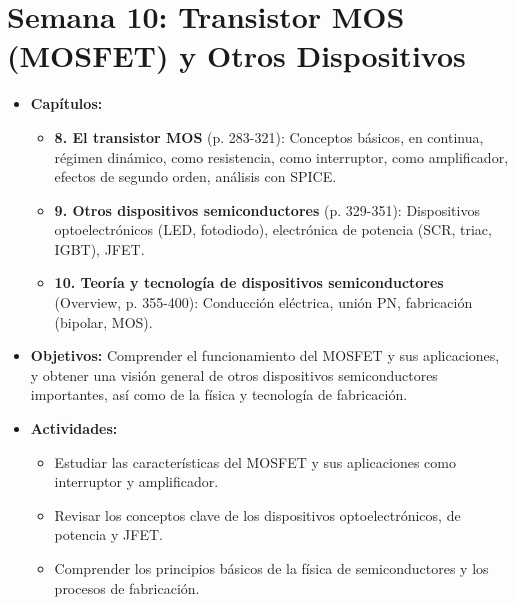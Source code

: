 \documentclass[12pt,a4paper]{article}
\begin{document}
\section{Semana 10: Transistor MOS (MOSFET) y Otros Dispositivos}
\begin{itemize}
    \item \textbf{Capítulos:}
    \begin{itemize}
        \item \textbf{8. El transistor MOS} (p. 283-321): Conceptos básicos, en continua, régimen dinámico, como resistencia, como interruptor, como amplificador, efectos de segundo orden, análisis con SPICE.
        \item \textbf{9. Otros dispositivos semiconductores} (p. 329-351): Dispositivos optoelectrónicos (LED, fotodiodo), electrónica de potencia (SCR, triac, IGBT), JFET.
        \item \textbf{10. Teoría y tecnología de dispositivos semiconductores} (Overview, p. 355-400): Conducción eléctrica, unión PN, fabricación (bipolar, MOS).
    \end{itemize}
    \item \textbf{Objetivos:} Comprender el funcionamiento del MOSFET y sus aplicaciones, y obtener una visión general de otros dispositivos semiconductores importantes, así como de la física y tecnología de fabricación.
    \item \textbf{Actividades:}
    \begin{itemize}
        \item Estudiar las características del MOSFET y sus aplicaciones como interruptor y amplificador.
        \item Revisar los conceptos clave de los dispositivos optoelectrónicos, de potencia y JFET.
        \item Comprender los principios básicos de la física de semiconductores y los procesos de fabricación.
    \end{itemize}
\end{itemize}
\end{document}
